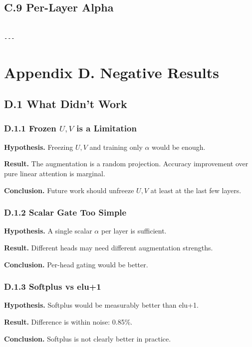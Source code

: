 \subsection{C.9 Per-Layer Alpha}

\begin{lstlisting}

---
\end{lstlisting}


\section{Appendix D. Negative Results}

\subsection{D.1 What Didn't Work}

\subsubsection{D.1.1 Frozen $U, V$ is a Limitation}

\textbf{Hypothesis.} Freezing $U, V$ and training only $\alpha$ would be enough.

\textbf{Result.} The augmentation is a random projection. Accuracy improvement 
over pure linear attention is marginal.

\textbf{Conclusion.} Future work should unfreeze $U, V$ at least at the 
last few layers.

\subsubsection{D.1.2 Scalar Gate Too Simple}

\textbf{Hypothesis.} A single scalar $\alpha$ per layer is sufficient.

\textbf{Result.} Different heads may need different augmentation strengths.

\textbf{Conclusion.} Per-head gating would be better.

\subsubsection{D.1.3 Softplus vs elu+1}

\textbf{Hypothesis.} Softplus would be measurably better than elu+1.

\textbf{Result.} Difference is within noise: 0.85\%.

\textbf{Conclusion.} Softplus is not clearly better in practice.


